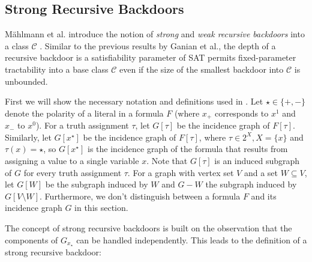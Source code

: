 \documentclass[11pt,a4paper]{article}
\theoremstyle{definition}
\theoremstyle{proposition}
\begin{document}
\subsection{Strong Recursive Backdoors}

Mählmann et al. introduce the notion of \textit{strong} and \textit{weak recursive backdoors} into a class $\mathcal{C}$ \cite{maehlmann2021recursive}. Similar to the previous results by Ganian et al., the depth of a recursive backdoor is a satisfiability parameter of SAT permits fixed-parameter tractability into a base class $\mathcal{C}$ even if the size of the smallest backdoor into $\mathcal{C}$ is unbounded. 

First we will show the necessary notation and definitions used in \cite{maehlmann2021recursive}. Let $\star \in \{+,-\}$ denote the polarity of a literal in a formula $F$ (where $x_+$ corresponds to $x^1$ and $x_-$ to $x^0$). For a truth assignment $\tau$, let $G[\tau]$ be the incidence graph of $F[\tau]$. Similarly, let $G[x^{\star}]$ be the incidence graph of $F[\tau]$, where $\tau \in 2^X, X = \{x\}$ and $\tau(x) = \star$, so $G[x^{\star}]$ is the incidence graph of the formula that results from assigning a value to a single variable $x$. Note that $G[\tau]$ is an induced subgraph of $G$ for every truth assignment $\tau$. 
For a graph with vertex set $V$ and a set $W \subseteq V$, let $G[W]$ be the subgraph induced by $W$ and $G - W$ the subgraph induced by $G[V \setminus{W}]$. Furthermore, we don't distinguish between a formula $F$ and its incidence graph $G$ in this section. 

The concept of strong recursive backdoors is built on the observation that the components of $G_{x_{\star}}$ can be handled independently. This leads to the definition of a strong recursive backdoor:
\end{document}
